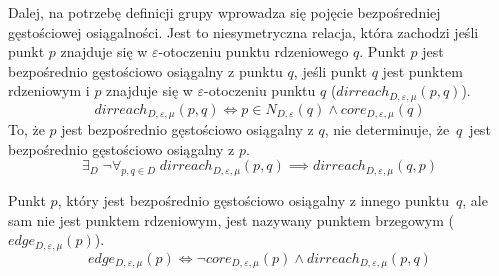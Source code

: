\newline
Dalej, na potrzebę definicji grupy wprowadza się pojęcie bezpośredniej gęstościowej osiągalności. Jest to niesymetryczna relacja, która zachodzi jeśli punkt $ p $ znajduje się w $ \varepsilon $-otoczeniu punktu rdzeniowego $ q $. Punkt $ p $ jest bezpośrednio gęstościowo osiągalny z punktu $ q $, jeśli punkt $ q $ jest punktem rdzeniowym i $ p $ znajduje się w $ \varepsilon $-otoczeniu punktu $ q $ ($ dirreach_{D,\varepsilon,\mu}(p, q) $).
\begin{equation} \label{direct-reachability}
	dirreach_{D,\varepsilon,\mu}(p, q) \iff p \in N_{D,\varepsilon}(q) \land core_{D,\varepsilon,\mu}(q)
\end{equation}
To, że $ p $ jest bezpośrednio gęstościowo osiągalny z $ q $, nie determinuje, \mbox{że $ q $ jest} bezpośrednio gęstościowo osiągalny z $ p $.
\begin{equation} \label{direct-reachability-asymmetry}
	\exists_D\;\neg\forall_{p,q\in D}\;dirreach_{D,\varepsilon,\mu}(p, q) \implies dirreach_{D,\varepsilon,\mu}(q, p)
\end{equation}

\newline
Punkt $ p $, który jest bezpośrednio gęstościowo osiągalny z innego \mbox{punktu $ q $}, ale sam nie jest punktem rdzeniowym, jest nazywany punktem brzegowym ($ edge_{D,\varepsilon,\mu}(p) $).
\begin{equation}\label{edge-point}
	edge_{D,\varepsilon,\mu}(p) \iff \neg core_{D,\varepsilon,\mu}(p) \land dirreach_{D,\varepsilon,\mu}(p,q)
\end{equation}


